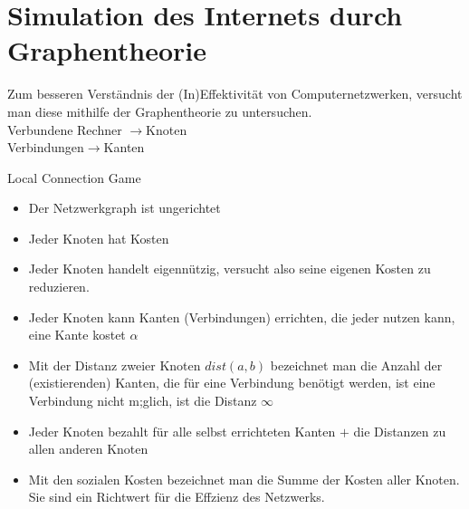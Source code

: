 \documentclass{beamer}
\begin{document}
\section{Simulation des Internets durch Graphentheorie}
\begin{frame}
\begin{tabbing}
Zum besseren Verst\"andnis der (In)Effektivit\"at von Computernetzwerken, versucht man diese mithilfe der Graphentheorie zu untersuchen.
\hspace{5cm}\=\\
Verbundene Rechner \>$\longrightarrow$Knoten\\
Verbindungen\>$\longrightarrow$Kanten\\
\end{tabbing}

\end{frame}
\begin{frame}[plain]
\begin{block}
{Local Connection Game}
\begin{itemize}
        \item Der Netzwerkgraph ist ungerichtet
        \item Jeder Knoten hat Kosten
        \item Jeder Knoten handelt eigenn\"utzig, versucht also seine eigenen Kosten zu reduzieren.
        \item Jeder Knoten kann Kanten (Verbindungen) errichten, die jeder nutzen kann, eine Kante kostet $\alpha$
        \item Mit der Distanz zweier Knoten $dist(a,b)$ bezeichnet man die Anzahl der (existierenden) Kanten, die f\"ur eine Verbindung ben\"otigt werden, ist eine Verbindung nicht m;glich, ist die Distanz $\infty$
        \item Jeder Knoten bezahlt f\"ur alle selbst errichteten Kanten $+$ die Distanzen zu allen anderen Knoten
        \item Mit den sozialen Kosten bezeichnet man die Summe der Kosten aller Knoten. Sie sind ein Richtwert f\"ur die Effzienz des Netzwerks.
\end{itemize}
\end{block}
\end{frame}
\end{document}
